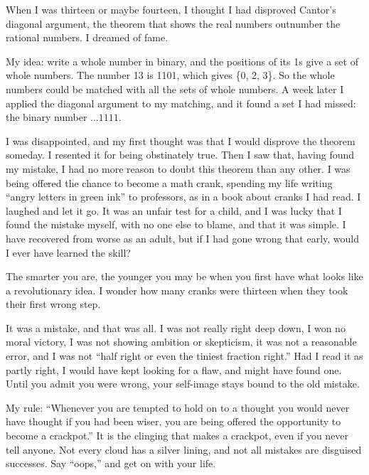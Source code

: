 
When I was thirteen or maybe fourteen, I thought I had disproved Cantor's diagonal argument, the theorem that shows the real numbers outnumber the rational numbers. I dreamed of fame. 

My idea: write a whole number in binary, and the positions of its 1s give a set of whole numbers. The number 13 is 1101, which gives \{0, 2, 3\}. So the whole numbers could be matched with all the sets of whole numbers. A week later I applied the diagonal argument to my matching, and it found a set I had missed: the binary number $\ldots1111$. 

I was disappointed, and my first thought was that I would disprove the theorem someday. I resented it for being obstinately true. Then I saw that, having found my mistake, I had no more reason to doubt this theorem than any other. I was being offered the chance to become a math crank, spending my life writing ``angry letters in green ink'' to professors, as in a book about cranks I had read. I laughed and let it go. It was an unfair test for a child, and I was lucky that I found the mistake myself, with no one else to blame, and that it was simple. I have recovered from worse as an adult, but if I had gone wrong that early, would I ever have learned the skill?

The smarter you are, the younger you may be when you first have what looks like a revolutionary idea. I wonder how many cranks were thirteen when they took their first wrong step.

It was a mistake, and that was all. I was not really right deep down, I won no moral victory, I was not showing ambition or skepticism, it was not a reasonable error, and I was not ``half right or even the tiniest fraction right.''  Had I read it as partly right, I would have kept looking for a flaw, and might have found one. Until you admit you were wrong, your self-image stays bound to the old mistake.

My rule: ``Whenever you are tempted to hold on to a thought you would never have thought if you had been wiser, you are being offered the opportunity to become a crackpot.'' It is the clinging that makes a crackpot, even if you never tell anyone. Not every cloud has a silver lining, and not all mistakes are disguised successes. Say ``oops,'' and get on with your life.
